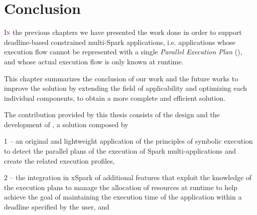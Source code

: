 \chapter{Conclusion} \label{chap:conclusion}
\lettrine[lines=4]{\textcolor{purple}{I}}{n} the previous chapters we have presented the work done in order to support deadline-based \qos constrained multi-\plan Spark applications, i.e. applications whose execution flow cannot be represented with a single \textit{Parallel Execution Plan} (\plan), and whose actual execution flow is only known at runtime. 

This chapter summarizes the conclusion of our work and the future works to improve the solution by extending the field of applicability and optimizing each  individual components, to obtain a more complete and efficient solution.



The contribution provided by this thesis consists of the design and the development of \tool, a solution composed by 

1 -- an original and lightweight application of the principles of symbolic execution to detect the parallel plans of the execution of Spark multi-\plan applications and  create the related execution profiles, 

2 -- the integration in xSpark of additional features that exploit the knowledge of the execution plans to manage the allocation of resources at runtime to help achieve the goal of maintaining the execution time of the application within a deadline specified by the user, and 

